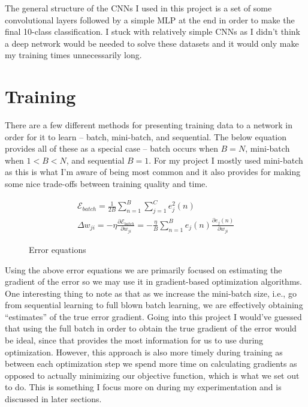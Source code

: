 \documentclass[12pt, twoside]{report}
\begin{document}
The general structure of the CNNs I used in this project is a set of some convolutional layers followed
by a simple MLP at the end in order to make the final 10-class classification. I stuck with relatively simple
CNNs as I didn't think a deep network would be needed to solve these datasets and it would only make
my training times unnecessarily long.

\section{Training}

There are a few different methods for presenting training data to a network in order
for it to learn – batch, mini-batch, and sequential. The below equation provides all of these
as a special case – batch occurs when $B = N$, mini-batch when $1 < B < N$, and sequential $B = 1$.
For my project I mostly used mini-batch as this is what I'm aware of being most common and it also provides
for making some nice trade-offs between training quality and time.

\begin{figure}[H]
    \centering
    \begin{align}
        \mathcal{E}_{batch} = \frac{1}{2B} \sum_{n=1}^{B} \sum_{j=1}^{C} e_j^2(n) \\
        \Delta w_{ji} = - \eta \frac{\partial \mathcal{E}_{batch}}{\partial w_{ji}} = 
        - \frac{\eta}{B} \sum_{n=1}^{B} e_j(n)\frac{\partial e_j(n)}{\partial w_{ji}}
    \end{align}
    \caption*{Error equations}
\end{figure}

Using the above error equations we are primarily focused on estimating the gradient of the error
so we may use it in gradient-based optimization algorithms. One interesting thing to note as that
as we increase the mini-batch size, i.e., go from sequential learning to full blown batch learning, 
we are effectively obtaining ``estimates'' of the true error gradient. Going into this project
I would've guessed that using the full batch in order to obtain the true gradient of the error
would be ideal, since that provides the most information for us to use during optimization.
However, this approach is also more timely during training as between each optimization step we
spend more time on calculating gradients as opposed to actually minimizing our objective function, 
which is what we set out to do. This is something I focus more on during my experimentation and is 
discussed in later sections.
\end{document}

